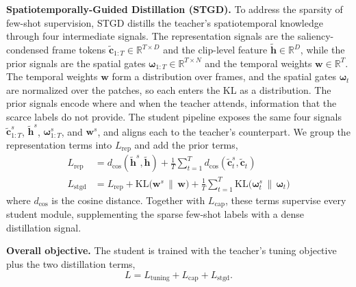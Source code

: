\noindent\textbf{Spatiotemporally-Guided Distillation (STGD).}
To address the sparsity of few-shot supervision,
STGD distills the teacher's spatiotemporal knowledge through
four intermediate signals.
The representation signals are the saliency-condensed frame tokens
$\tilde{\mathbf{c}}_{1:T}\in\mathbb{R}^{T\times D}$ and the clip-level feature
$\tilde{\mathbf{h}}\in\mathbb{R}^{D}$, while the prior signals are the spatial gates
$\boldsymbol{\omega}_{1:T}\in\mathbb{R}^{T\times N}$ and the temporal weights
$\mathbf{w}\in\mathbb{R}^{T}$.
The temporal weights $\mathbf{w}$ form a distribution over frames, and the
spatial gates $\boldsymbol{\omega}_{t}$ are normalized over the patches, so
each enters the KL as a distribution.
The prior signals encode where and when the teacher attends, information that the scarce labels do
not provide.
The student pipeline exposes the same four signals
$\tilde{\mathbf{c}}^{s}_{1:T}$, $\tilde{\mathbf{h}}^{s}$, $\boldsymbol{\omega}^{s}_{1:T}$, and
$\mathbf{w}^{s}$, and aligns each to the teacher's counterpart.
We group the representation terms into $L_\mathrm{rep}$ and add the prior terms,
\begin{equation}
  \begin{split}
    L_\mathrm{rep} &= d_{\cos}(\tilde{\mathbf{h}}^{s}, \tilde{\mathbf{h}})
      + \frac{1}{T}\sum_{t=1}^{T} d_{\cos}(\tilde{\mathbf{c}}^{s}_t, \tilde{\mathbf{c}}_t) \\
    L_\mathrm{stgd} &= L_\mathrm{rep}
      + \mathrm{KL}\!\big(\mathbf{w}^{s} \,\|\, \mathbf{w}\big)
      + \frac{1}{T}\sum_{t=1}^{T}\mathrm{KL}\!\big(\boldsymbol{\omega}^{s}_t \,\|\,
        \boldsymbol{\omega}_t\big)
  \end{split}
\end{equation}
where $d_{\cos}$ is the cosine distance.
Together with $L_\mathrm{cap}$, these terms supervise every student module,
supplementing the sparse few-shot labels with a dense distillation signal.

\noindent\textbf{Overall objective.}
The student is trained with the teacher's tuning objective plus the two
distillation terms,
\begin{equation}
  L = L_\mathrm{tuning} + L_\mathrm{cap} + L_\mathrm{stgd}.
\end{equation}


